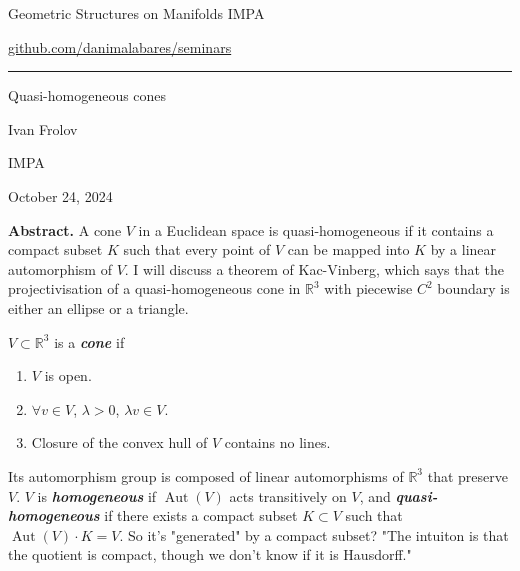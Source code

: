 



\begin{minipage}{\textwidth}
	\begin{minipage}{1\textwidth}
		Geometric Structures on Manifolds \hfill IMPA
		
		{\small\hfill\href{https://github.com/danimalabares/seminars}{github.com/danimalabares/seminars}}

		
	\end{minipage}
\end{minipage}\vspace{.2cm}\hrule

\vspace{10pt}

{\Huge Quasi-homogeneous cones}


\hfill{\Large Ivan Frolov}

{\Large \hfill IMPA}

\hfill{\large October 24, 2024}

\vspace{1em}


{\color{6}\bfseries Abstract.}\hspace{.5em} A cone $V$ in a Euclidean space is quasi-homogeneous if it contains a compact subset $K$ such that every point of $V$ can be mapped into $K$ by a linear automorphism of $V$. I will discuss a theorem of Kac-Vinberg, which says that the projectivisation of a quasi-homogeneous cone in $\mathbb{R}^{3}$ with piecewise $C^2$ boundary is either an ellipse or a triangle.

\tableofcontents

\begin{defn}\leavevmode
	$V\subset \mathbb{R}^{3}$ is a \textit{\textbf{cone}} if
	\begin{enumerate}
		\item $V$ is open.
	
		\item $\forall v\in V$, $\lambda>0$, $\lambda v \in V$.
		\item Closure of the convex hull of $V$ contains no lines.
	\end{enumerate}
	Its automorphism group is composed of linear automorphisms of $\mathbb{R}^{3}$ that preserve $V$. $V$ is \textit{\textbf{homogeneous}} if $\operatorname{Aut}(V)$ acts transitively on $V$, and  \textit{\textbf{quasi-homogeneous}} if there exists a compact subset $K\subset V$ such that $\operatorname{Aut}(V)\cdot K=V$. {\color{8}So it's "generated" by a compact subset?} {\color{3}"The intuiton is that the quotient is compact, though we don't know if it is Hausdorff."}
\end{defn}

